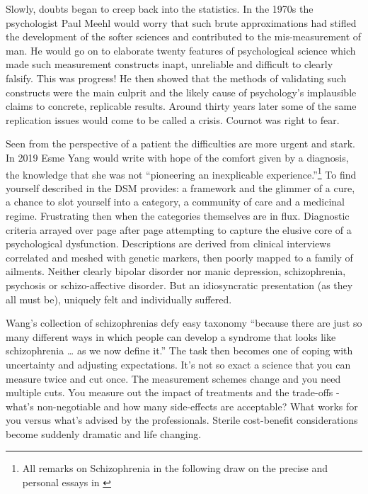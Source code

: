 \documentclass[]{tufte-book}
\theoremstyle{definition}
\theoremstyle{definition}
\theoremstyle{definition}
\theoremstyle{remark}
\begin{document}
Slowly, doubts began to creep back into the statistics. In the 1970s the psychologist Paul Meehl would worry that such brute approximations had stifled the development of the softer sciences and contributed to the mis-measurement of man. He would go on to elaborate twenty features of psychological science which made such measurement constructs inapt, unreliable and difficult to clearly falsify. This was progress! \citep{MeehlTheoretical} He then showed that the methods of validating such constructs were the main culprit and the likely cause of psychology's implausible claims to concrete, replicable results. Around thirty years later some of the same replication issues would come to be called a crisis. Cournot was right to fear.

Seen from the perspective of a patient the difficulties are more urgent and stark. In 2019 Esme Yang would write with hope of the comfort given by a diagnosis, the knowledge that she was not ``pioneering an inexplicable experience.''\footnote{All remarks on Schizophrenia in the following draw on the precise and personal essays in \citep{WangSchizophrenia}} To find yourself described in the DSM provides: a framework and the glimmer of a cure, a chance to slot yourself into a category, a community of care and a medicinal regime. Frustrating then when the categories themselves are in flux. Diagnostic criteria arrayed over page after page attempting to capture the elusive core of a psychological dysfunction. Descriptions are derived from clinical interviews correlated and meshed with genetic markers, then poorly mapped to a family of ailments. Neither clearly bipolar disorder nor manic depression, schizophrenia, psychosis or schizo-affective disorder. But an idiosyncratic presentation (as they all must be), uniquely felt and individually suffered.

Wang's collection of schizophrenias defy easy taxonomy ``because there are just so many different ways in which people can develop a syndrome that looks like schizophrenia \ldots{} as we now define it.'' The task then becomes one of coping with uncertainty and adjusting expectations. It's not so exact a science that you can measure twice and cut once. The measurement schemes change and you need multiple cuts. You measure out the impact of treatments and the trade-offs - what's non-negotiable and how many side-effects are acceptable? What works for you versus what's advised by the professionals. Sterile cost-benefit considerations become suddenly dramatic and life changing.
\end{document}
